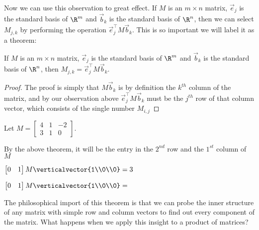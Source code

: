 \documentclass{ximera}
\begin{document}
Now we can use this observation to great effect.  If $M$ is an $m \times n$ matrix,  $\vec{e}_j$ is the standard basis of $\R^m$ and $\vec{b}_k$ is the
standard basis of $\R^n$, then we can select $M_{j,k}$ by performing the operation $\vec{e}_j^\top M \vec{b}_k$.  
This is so important we will label it as a theorem:

\begin{theorem}
	If $M$ is an $m \times n$ matrix,  $\vec{e}_j$ is the standard basis of $\R^m$ and $\vec{b}_k$ is the
standard basis of $\R^n$, then $M_{j,k}=\vec{e}_j^\top M \vec{b}_k$.  
\end{theorem}

\begin{proof}
	The proof is simply that $M\vec{b}_k$ is by definition the $k^{th}$ column of the matrix, and by our observation above $\vec{e}_j^\top M \vec{b}_k$
	must be the $j^{th}$ row of that column vector, which consists of the single number $M_{i,j}$
\end{proof}

\begin{question}
	Let $M = \begin{bmatrix} 4&1&-2\\3&1&0\end{bmatrix}$.  
	\begin{solution}
		\begin{hint}
			By the above theorem, it will be the entry in the $2^{nd}$ row and the $1^{st}$ column of $M$
		\end{hint}
		\begin{hint}
			$\begin{bmatrix} 0&1\end{bmatrix} M \verticalvector{1\\0\\0}=3$
		\end{hint}
	$\begin{bmatrix} 0&1\end{bmatrix} M \verticalvector{1\\0\\0}=$
	\end{solution}
\end{question}

The philosophical import of this theorem is that we can probe the inner structure of any matrix with simple row and column vectors to find out every
component of the matrix.  What happens when we apply this insight to a product of matrices?
\end{document}
